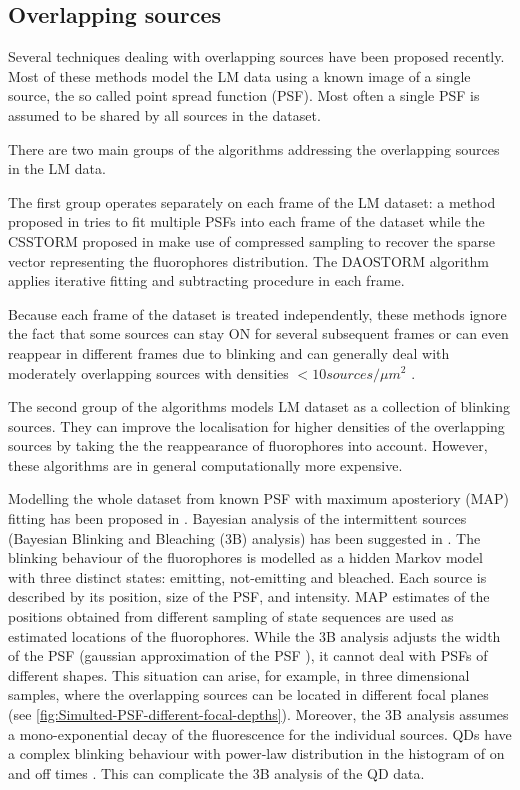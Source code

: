 
\subsection{Overlapping sources\label{sec:Overlapping sources}}

Several techniques dealing with overlapping sources have been proposed recently. Most of these methods model the LM data using a known image of a single source, the so called point spread function (PSF). Most often a single PSF is assumed to be shared by all sources in the dataset.

There are two main groups of the algorithms addressing the overlapping sources in the LM data. 

The first group operates separately on each frame of the LM dataset: a method proposed in \cite{Huang2011} tries to fit multiple PSFs into each frame of the dataset while the CSSTORM proposed in \cite{Zhu2012} make use of compressed sampling to recover the sparse vector representing the fluorophores distribution. The DAOSTORM algorithm \cite{Holden2011} applies iterative fitting and subtracting procedure in each frame. 

Because each frame of the dataset is treated independently, these methods ignore the fact that some sources can stay ON for several subsequent frames or can even reappear in different frames due to blinking and can generally deal with moderately overlapping sources with densities $<10\unit{sources/\mu m^{2}}$ \cite{Huang2011,Holden2011,Zhu2012}.

The second group of the algorithms models LM dataset as a collection of blinking sources. They can improve the localisation for higher densities of the overlapping sources by taking the the reappearance of fluorophores into account. However, these algorithms are in general computationally more expensive. 

Modelling the whole dataset from known PSF with maximum aposteriory (MAP) fitting has been proposed in \cite{Harrington2008}. Bayesian analysis of the intermittent sources (Bayesian Blinking and Bleaching (3B) analysis) has been suggested in \cite{Cox2011}. The blinking behaviour of the fluorophores is modelled as a hidden Markov model with three distinct states: emitting, not-emitting and bleached. Each source is described by its position, size of the PSF, and intensity. MAP estimates of the positions obtained from different sampling of state sequences are used as estimated locations of the fluorophores. While the 3B analysis adjusts the width of the PSF (gaussian approximation of the PSF \cite{Zhang2007}), it cannot deal with PSFs of different shapes. This situation can arise, for example, in three dimensional samples, where the overlapping sources can be located in different focal planes (see \autoref{fig:Simulted-PSF-different-focal-depths}). Moreover, the 3B analysis assumes a mono-exponential decay of the fluorescence for the individual sources. QDs have a complex blinking behaviour with power-law distribution in the histogram of on and off times \cite{Shimizu2001}. This can complicate the 3B analysis of the QD data. 

